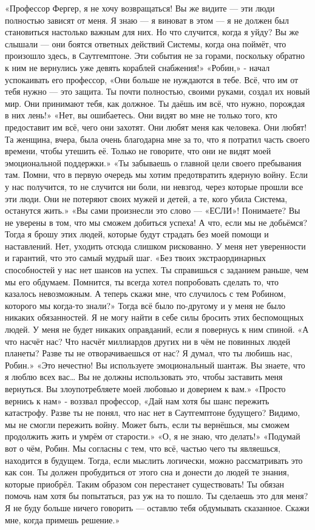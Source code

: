 \documentclass[a4paper,12pt]{book}
\begin{document}
	«Профессор Фергер, я не хочу возвращаться! Вы же видите — эти люди полностью зависят от меня. Я знаю — я виноват в этом — я не должен был становиться настолько важным для них. Но что случится, когда я уйду? Вы же слышали — они боятся ответных действий Системы, когда она поймёт, что произошло здесь, в Саутгемптоне. Эти события не за горами, поскольку обратно к ним не вернулись уже девять кораблей снабжения!»
	«Робин,» - начал успокаивать его профессор,
	«Они больше не нуждаются в тебе. Всё, что им от тебя нужно — это защита. Ты почти полностью, своими руками, создал их новый мир. Они принимают тебя, как должное. Ты даёшь им всё, что нужно, порождая в них лень!»
	«Нет, вы ошибаетесь. Они видят во мне не только того, кто предоставит им всё, чего они захотят. Они любят меня как человека. Они любят! Та женщина, вчера, была очень благодарна мне за то, что я потратил часть своего времени, чтобы утешить её. Только не говорите, что они не видят моей эмоциональной поддержки.»	
	«Ты забываешь о главной цели своего пребывания там. Помни, что в первую очередь мы хотим предотвратить ядерную войну. Если у нас получится, то не случится ни боли, ни невзгод, через которые прошли все эти люди. Они не потеряют своих мужей и детей, а те, кого убила Система, останутся жить.»
	«Вы сами произнесли это слово — «ЕСЛИ»! Понимаете? Вы не уверены в том, что мы сможем добиться успеха! А что, если мы не добьёмся? Тогда я брошу этих людей, которые будут страдать без моей помощи и наставлений. Нет, уходить отсюда слишком рискованно. У меня нет уверенности и гарантий, что это самый мудрый шаг.
	«Без твоих экстраординарных способностей у нас нет шансов на успех. Ты справишься с заданием раньше, чем мы его обдумаем. Помнится, ты всегда хотел попробовать сделать то, что казалось невозможным. А теперь скажи мне, что случилось с тем Робином, которого мы когда-то знали?»
	Тогда всё было по-другому и у меня не было никаких обязанностей. Я не могу найти в себе силы бросить этих беспомощных людей. У меня не будет никаких оправданий, если я повернусь к ним спиной.
	«А что насчёт нас? Что насчёт миллиардов других ни в чём не повинных людей планеты? Разве ты не отворачиваешься от нас? Я думал, что ты любишь нас, Робин.»
	«Это нечестно! Вы используете эмоциональный шантаж. Вы знаете, что я люблю всех вас… Вы не должны использовать это, чтобы заставить меня вернуться. Вы злоупотребляете моей любовью и доверием к вам.»
	«Просто вернись к нам» - воззвал профессор,
	«Дай нам хотя бы шанс пережить катастрофу. Разве ты не понял, что нас нет в Саутгемптоне будущего? Видимо, мы не смогли пережить войну. Может быть, если ты вернёшься, мы сможем продолжить жить и умрём от старости.»
	«О, я не знаю, что делать!»
	«Подумай вот о чём, Робин. Мы согласны с тем, что всё, частью чего ты являешься, находится в будущем. Тогда, если мыслить логически, можно рассматривать это как сон. Ты должен пробудиться от этого сна и донести до людей те знания, которые приобрёл. Таким образом сон перестанет существовать! Ты обязан помочь нам хотя бы попытаться, раз уж на то пошло. Ты сделаешь это для меня? Я не буду больше ничего говорить — оставлю тебя обдумывать сказанное. Скажи мне, когда примешь решение.»
\end{document}
